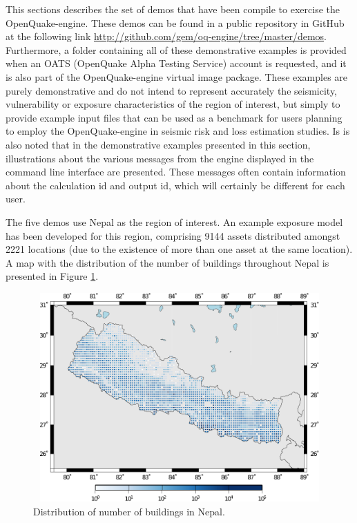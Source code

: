 This sections describes the set of demos that have been compile to exercise the OpenQuake-engine. These demos can be found in a public repository in GitHub at the following link \href{http://github.com/gem/oq-engine/tree/master/demos}{http://github.com/gem/oq-engine/tree/master/demos}. Furthermore, a folder containing all of these demonstrative examples is provided when an OATS (OpenQuake Alpha Testing Service) account is requested, and it is also part of the OpenQuake-engine virtual image package. These examples are purely demonstrative and do not intend to represent accurately the seismicity, vulnerability or exposure characteristics of the region of interest, but simply to provide example input files that can be used as a benchmark for users planning to employ the OpenQuake-engine in seismic risk and loss estimation studies. Is is also noted that in the demonstrative examples presented in this section, illustrations about the various messages from the engine displayed in the command line interface are presented. These messages often contain information about the calculation id and output id, which will certainly be different for each user.

The five demos use Nepal as the region of interest. An example \gls{exposure model} has been developed for this region, comprising 9144 assets distributed amongst 2221 locations (due to the existence of more than one \gls{asset} at the same location). A map with the distribution of the number of buildings throughout Nepal is presented in Figure \ref{fig:expNepal}.

\begin{figure}[ht]
\centering
\includegraphics[width=12cm,height=8cm]{figures/risk/NepalExposure.pdf}
\caption{Distribution of number of buildings in Nepal.}
\label{fig:expNepal}
\end{figure}

